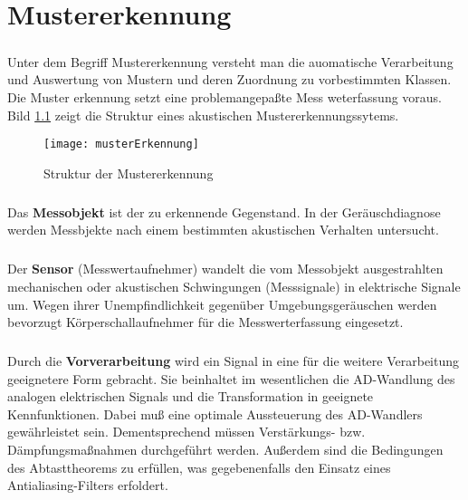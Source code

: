 \chapter{Mustererkennung}

\paragraph{}
Unter dem Begrif\mbox{}f Mustererkennung versteht man die auomatische
Verarbeitung und Auswertung von Mustern und deren Zuordnung zu vorbestimmten
Klassen. Die Muster erkennung setzt eine problemangepa\ss{}te Mess%
weterfassung voraus. Bild \ref{fig:mustererkennung} zeigt die Struktur eines
akustischen \cite{mekonnen92} Mustererkennungssytems.

\begin{figure}[ht]
\centering
\texttt{[image: musterErkennung]}
\caption{Struktur der Mustererkennung}
\label{fig:mustererkennung}
\end{figure}

\paragraph{}
Das \textbf{Messobjekt} ist der zu erkennende Gegenstand. In der 
Ger\"auschdiagnose werden Messbjekte nach einem bestimmten akustischen
Verhalten untersucht.

\paragraph{}
Der \textbf{Sensor} (Messwertaufnehmer) wandelt die vom Messobjekt
ausgestrahlten mechanischen oder akustischen Schwingungen (Messsignale) in
elektrische Signale um. Wegen ihrer Unempfindlichkeit gegen\"uber
Umgebungsger\"auschen werden bevorzugt K\"orperschallaufnehmer f\"ur die
Messwerterfassung eingesetzt.

\paragraph{}
Durch die \textbf{Vorverarbeitung} wird ein Signal in eine f\"ur die weitere
Verarbeitung geeignetere Form gebracht. Sie beinhaltet im wesentlichen die
AD-Wandlung des analogen elektrischen Signals und die Transformation in
geeignete Kennfunktionen. Dabei mu\ss{} eine optimale Aussteuerung des
AD-Wandlers gew\"ahrleistet sein. Dementsprechend m\"ussen Verst\"arkungs-
bzw. D\"ampfungsma\ss{}nahmen durchgef\"uhrt werden. Au\ss{}erdem sind die
Bedingungen des Abtasttheorems zu erf\"ullen, was gegebenenfalls den Einsatz
eines Antialiasing-Filters erfoldert.

